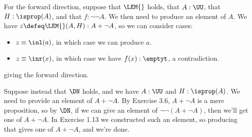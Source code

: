  \soln
For the forward direction, suppose that $\LEM{}$ holds, that $A : \UU$,
that $H : \isprop(A)$, and that $f : \lnot\lnot A$.  We then need to produce an
element of $A$.  We have $z \defeq \LEM{}(A, H) : A + \lnot A$, so we can
consider cases:



\begin{itemize}
\item  $z \equiv \inl(a)$, in which case we can produce $a$.

\item  $z \equiv \inr(x)$, in which case we have $f(x) : \emptyt$, a contradiction.

\end{itemize}
giving the forward direction.


Suppose instead that $\DN$ holds, and we have $A : \UU$ and $H : \isprop(A)$.
We need to provide an element of $A + \lnot A$.  By Exercise 3.6, $A + \lnot A$
is a mere proposition, so by $\DN$, if we can give an element of $\lnot\lnot(A
+ \lnot A)$, then we'll get one of $A + \lnot A$.  In Exercise 1.13 we
constructed such an element, so producing that gives one of $A + \lnot A$, and
we're done.
